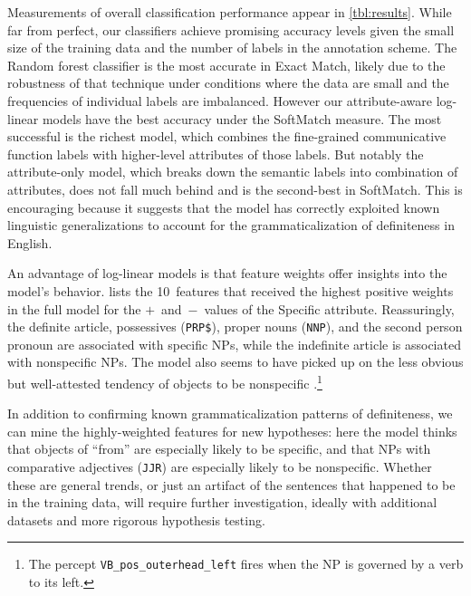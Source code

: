 \documentclass[11pt,letterpaper]{article}
\begin{document}
Measurements of overall classification performance appear in \cref{tbl:results}. While far from perfect, our classifiers achieve promising accuracy levels 
given the small size of the training data and the number of labels in the annotation scheme.
The Random forest classifier is the most accurate in Exact Match, likely due to the robustness of that technique under
conditions where the data are small and the frequencies of individual labels are imbalanced. However
our attribute-aware log-linear models have the best accuracy under the SoftMatch measure. The most successful is the richest model, which combines the fine-grained 
communicative function labels with higher-level attributes of those labels. But notably the attribute-only model,
which breaks down the semantic labels into combination of attributes, does not fall much behind and is the second-best
in SoftMatch.
This is encouraging because it suggests that the model has correctly exploited known linguistic generalizations 
to account for the grammaticalization of definiteness in English. 

An advantage of log-linear models is that feature weights offer insights into the model's behavior.
 lists the 10~features that received the highest positive weights in the full model 
for the \mbox{$+$ and $-$ values} of the Specific attribute. Reassuringly, the definite article, 
possessives (\texttt{PRP\$}), proper nouns (\texttt{NNP}), and the second person pronoun 
are associated with specific NPs, while the indefinite article is associated with nonspecific NPs.
The model also seems to have picked up on the less obvious but well-attested tendency 
of objects to be nonspecific \citep{aissen-03}.\footnote{The percept \texttt{VB\_pos\_outerhead\_left} 
fires when the NP is governed by a verb to its left.}

In addition to confirming known grammaticalization patterns of definiteness, 
we can mine the highly-weighted features for new hypotheses: 
here the model thinks that objects of ``from'' are especially likely to be specific, 
and that NPs with comparative adjectives (\texttt{JJR}) are especially likely to be nonspecific.
Whether these are general trends, or just an artifact of the sentences that happened to be in the training data, 
will require further investigation, ideally with additional datasets and more rigorous hypothesis testing.
\end{document}
